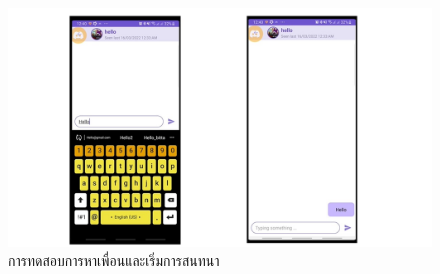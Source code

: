 \begin{figure}
    \begin{center}
      \includegraphics[width=1\textwidth]{./image/testing/Slide13.JPG}
    \end{center}
    \caption[การทดสอบการหาเพื่อนและเริ่มการสนทนา]{การทดสอบการหาเพื่อนและเริ่มการสนทนา}
    \end{figure}